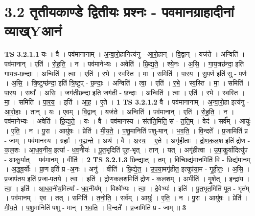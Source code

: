 \documentclass[17pt]{extarticle}
\begin{document}
\section*{ 3.2     तृतीयकाण्डे द्वितीयः प्रश्नः - पवमानग्राहादीनां व्याख्Yआनं }
                                \textbf{ TS 3.2.1.1} \newline
                  यः । वै । पव॑मानानाम् । अ॒न्वा॒रो॒हानित्य॑नु - आ॒रो॒हान् । वि॒द्वान् । यज॑ते । अन्विति॑ । पव॑मानान् । एति॑ । रो॒ह॒ति॒ । न । पव॑मानेभ्यः । अवेति॑ । छि॒द्य॒ते॒ । श्ये॒नः । अ॒सि॒ । गा॒य॒त्रछ॑न्दा॒ इति॑ गाय॒त्र-छ॒न्दाः॒ । अन्विति॑ । त्वा॒ । एति॑ । र॒भे॒ । स्व॒स्ति । मा॒ । समिति॑ । पा॒र॒य॒ । सु॒प॒र्ण इति॑ सु - प॒र्णः । अ॒सि॒ । त्रि॒ष्टुप्छ॑न्दा॒ इति॑ त्रि॒ष्टुप् - छ॒न्दाः॒ । अन्विति॑ । त्वा॒ । एति॑ । र॒भे॒ । स्व॒स्ति । मा॒ । समिति॑ । पा॒र॒य॒ । सघा᳚ । अ॒सि॒ । जग॑तीछन्दा॒ इति॒ जग॑ती - छ॒न्दाः॒ । अन्विति॑ । त्वा॒ । एति॑ । र॒भे॒ । स्व॒स्ति । मा॒ । समिति॑ । पा॒र॒य॒ । इति॑ । आ॒ह॒ । ए॒ते । \textbf{  1} \newline
                  \newline
                                \textbf{ TS 3.2.1.2} \newline
                  वै । पव॑मानानाम् । अ॒न्वा॒रो॒हा इत्य॑नु - आ॒रो॒हाः । तान् । यः । ए॒वम् । वि॒द्वान् । यज॑ते । अन्विति॑ । पव॑मानान् । एति॑ । रो॒ह॒ति॒ । न । पव॑मानेभ्यः । अवेति॑ । छि॒द्य॒ते॒ । यः । वै । पव॑मानस्य । संत॑ति॒मिति॒ सं - त॒ति॒म् । वेद॑ । सर्व᳚म् । आयुः॑ । ए॒ति॒ । न । पु॒रा । आयु॑षः । प्रेति॑ । मी॒य॒ते॒ । प॒शु॒मानिति॑ पशु-मान् । भ॒व॒ति॒ । वि॒न्दते᳚ । प्र॒जामिति॑ प्र - जाम् । पव॑मानस्य । ग्रहाः᳚ । गृ॒ह्य॒न्ते॒ । अथ॑ । वै । अ॒स्य॒ । ए॒ते । अगृ॑हीताः । द्रो॒ण॒क॒ल॒श इति॑ द्रोण - क॒ल॒शः । आ॒ध॒व॒नीय॒ इत्या᳚ - ध॒व॒नीयः॑ । पू॒त॒भृदिति॑ पूत-भृत् । तान् । यत् । अगृ॑हीत्वा । उ॒पा॒कु॒र्यादित्यु॑प - आ॒कु॒र्यात् । पव॑मानम् । वीति॑ । \textbf{  2} \newline
                  \newline
                                \textbf{ TS 3.2.1.3} \newline
                  छि॒न्द्या॒त् । तम् । वि॒च्छिद्य॑मान॒मिति॑ वि - छिद्य॑मानम् । अ॒द्ध्व॒र्योः । प्रा॒ण इति॑ प्र -अ॒नः । अनु॑ । वीति॑ । छि॒द्ये॒त॒ । उ॒प॒या॒मगृ॑हीत॒ इत्युप॑या॒म - गृ॒ही॒तः॒ । अ॒सि॒ । प्र॒जाप॑तय॒ इति॑ प्र॒जा-प॒त॒ये॒ । त्वा॒ । इति॑ । द्रो॒ण॒क॒ल॒शमिति॑ द्रोण - क॒ल॒शम् । अ॒भीति॑ । मृ॒शे॒त् । इन्द्रा॑य । त्वा॒ । इति॑ । आ॒ध॒व॒नीय॒मित्या᳚ - ध॒व॒नीय᳚म् । विश्वे᳚भ्यः । त्वा॒ । दे॒वेभ्यः॑ । इति॑ । पू॒त॒भृत॒मिति॑ पूत - भृत᳚म् । पव॑मानम् । ए॒व । तत् । समिति॑ । त॒नो॒ति॒ । सर्व᳚म् । आयुः॑ । ए॒ति॒ । न । पु॒रा । आयु॑षः । प्रेति॑ । मी॒य॒ते॒ । प॒शु॒मानिति॑ पशु - मान् । भ॒व॒ति॒ । वि॒न्दते᳚ । प्र॒जामिति॑ प्र - जाम् ॥ \textbf{  3 } \newline
\end{document}

